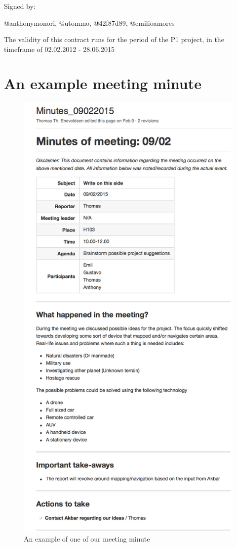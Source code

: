 Signed by:

@anthonymonori, @utommo, @42f87d89, @emilioamores

The validity of this contract runs for the period of the P1 project, in the timeframe of 02.02.2012 - 28.06.2015

\clearpage
\section{An example meeting minute}\label{appendix:meeting-minutes-example}

\begin{figure}[H]
	\centering
	\includegraphics[width=1\linewidth]{images/meeting-minute.png}
	\caption{An example of one of our meeting minute}
	\label{fig:meetingmin}
\end{figure}